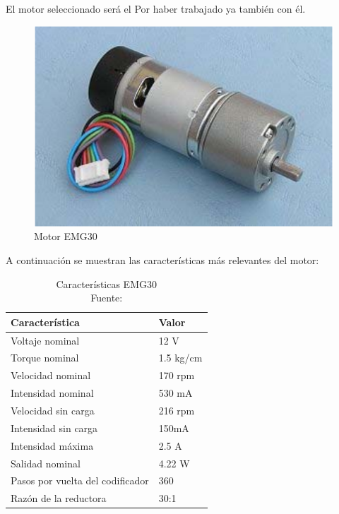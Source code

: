 El motor seleccionado será el\cite{EMG30datasheet} Por haber trabajado ya también con él.

\begin{figure}[H]
    \centering
    \includegraphics[scale = 0.4]{part/Proyecto_ejecutivo/memoria_constructiva/motor/img/MotorEMG30}
    \caption[Motor EMG30]{Motor EMG30\cite{EMG30datasheet}}\label{fig:EMG Motor}
\end{figure}

A continuación se muestran las características más relevantes del motor:

\begin{table}[H]
    \centering
    \begin{tabular}{|l|l|}
        \hline
        Característica & Valor\\
        \hline
        Voltaje nominal & 12 V\\
        \hline
        Torque nominal & 1.5 kg/cm\\
        \hline
        Velocidad nominal & 170 rpm\\
        \hline
        Intensidad nominal & 530 mA\\
        \hline
        Velocidad sin carga& 216 rpm\\
        \hline
        Intensidad sin carga& 150mA\\
        \hline
        Intensidad máxima& 2.5 A\\
        \hline
        Salidad nominal & 4.22 W\\
        \hline
        Pasos por vuelta del codificador& 360 \\
        \hline
        Razón de la reductora & 30:1\\
        \hline
    \end{tabular}
    \caption[Características EMG30]{Características EMG30 \\ Fuente:\cite{EMG30datasheet}}\label{tab:características EMG30}
\end{table}

